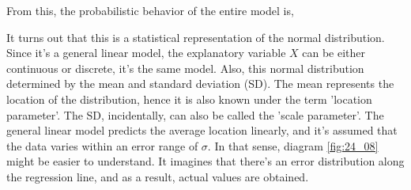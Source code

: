 \documentclass{ltjsbook}
\begin{document}
From this, the probabilistic behavior of the entire model is,

It turns out that this is a statistical representation of the normal distribution. Since it's a general linear model, the explanatory variable $X$ can be either continuous or discrete, it's the same model. Also, this normal distribution determined by the mean and standard deviation (SD). The mean represents the location of the distribution, hence it is also known under the term 'location parameter'. The SD, incidentally, can also be called the 'scale parameter'. The general linear model predicts the average location linearly, and it's assumed that the data varies within an error range of $\sigma$. In that sense, diagram \ref{fig:24_08} might be easier to understand. It imagines that there's an error distribution along the regression line, and as a result, actual values are obtained.


\end{document}
